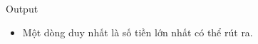 Output
\begin{itemize}
	\item     Một dòng duy nhất là số tiền lớn nhất có thể rút ra.   
\end{itemize}
